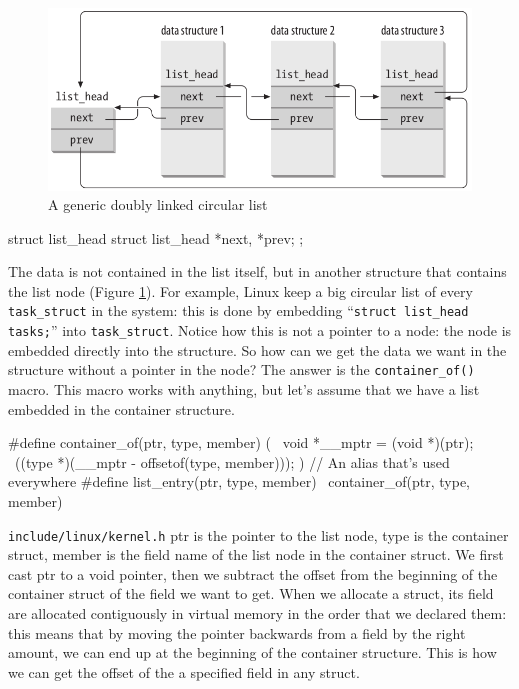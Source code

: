 \documentclass[10pt]{book}
\begin{document}
\begin{figure}[ht]
\includegraphics[width=\textwidth]{images/list.png}
\caption{A generic doubly linked circular list}
\label{img:list}
\end{figure}

\begin{code}
struct list_head {
	struct list_head *next, *prev;
};
\end{code}
The data is not contained in the list itself, but in another structure that contains the list node (Figure \ref{img:list}). For example, Linux keep a big circular list of every \verb|task_struct| in the system: this is done by embedding ``\verb|struct list_head tasks;|'' into \verb|task_struct|. Notice how this is not a pointer to a node: the node is embedded directly into the structure. So how can we get the data we want in the structure without a pointer in the node? The answer is the \verb|container_of()| macro. This macro works with anything, but let's assume that we have a list embedded in the container structure.
\begin{code}
#define container_of(ptr, type, member) ({ \
	void *__mptr = (void *)(ptr); \
	((type *)(__mptr - offsetof(type, member))); })
// An alias that's used everywhere
#define list_entry(ptr, type, member) \
        container_of(ptr, type, member)
\end{code}
\verb|include/linux/kernel.h|
ptr is the pointer to the list node, type is the container struct, member is the field name of the list node in the container struct. We first cast ptr to a void pointer, then we subtract the offset from the beginning of the container struct of the field we want to get. When we allocate a struct, its field are allocated contiguously in virtual memory in the order that we declared them: this means that by moving the pointer backwards from a field by the right amount, we can end up at the beginning of the container structure. This is how we can get the offset of the a specified field in any struct. 
\end{document}
